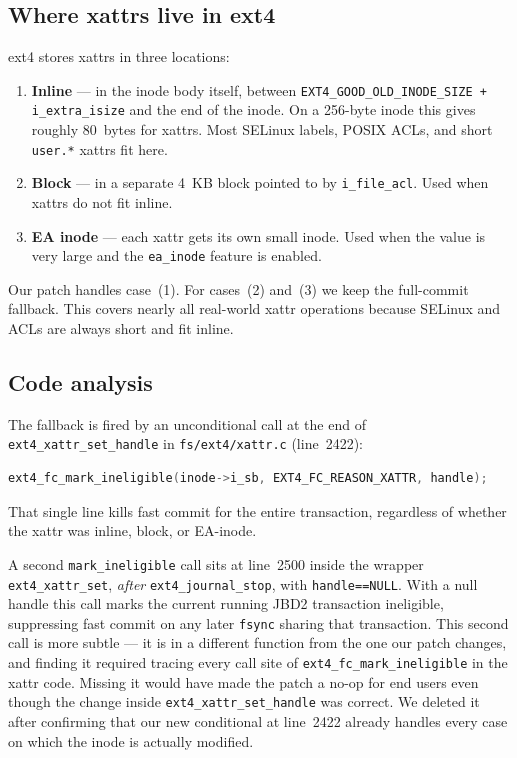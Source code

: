 \documentclass[12pt,a4paper]{article}
\begin{document}
\subsection{Where xattrs live in ext4}

ext4 stores xattrs in three locations:

\begin{enumerate}[leftmargin=*]
  \item \textbf{Inline} --- in the inode body itself, between
        \texttt{EXT4\_GOOD\_OLD\_INODE\_SIZE + i\_extra\_isize}
        and the end of the inode.  On a 256-byte inode this gives
        roughly 80~bytes for xattrs.  Most SELinux labels, POSIX
        ACLs, and short \texttt{user.*} xattrs fit here.
  \item \textbf{Block} --- in a separate 4~KB block pointed to by
        \texttt{i\_file\_acl}.  Used when xattrs do not fit inline.
  \item \textbf{EA inode} --- each xattr gets its own small inode.
        Used when the value is very large and the \texttt{ea\_inode}
        feature is enabled.
\end{enumerate}

Our patch handles case~(1).  For cases~(2) and~(3) we keep the
full-commit fallback.  This covers nearly all real-world xattr
operations because SELinux and ACLs are always short and fit inline.

\subsection{Code analysis}

The fallback is fired by an unconditional call at the end of
\texttt{ext4\_xattr\_set\_handle} in \texttt{fs/ext4/xattr.c}
(line~2422):

\begin{lstlisting}[language=C]
ext4_fc_mark_ineligible(inode->i_sb, EXT4_FC_REASON_XATTR, handle);
\end{lstlisting}

That single line kills fast commit for the entire transaction,
regardless of whether the xattr was inline, block, or EA-inode.

A second \texttt{mark\_ineligible} call sits at line~2500 inside
the wrapper \texttt{ext4\_xattr\_set}, \emph{after}
\texttt{ext4\_journal\_stop}, with \texttt{handle==NULL}.  With a
null handle this call marks the current running JBD2 transaction
ineligible, suppressing fast commit on any later \texttt{fsync}
sharing that transaction.  This second call is more subtle ---
it is in a different function from the one our patch changes, and
finding it required tracing every call site of
\texttt{ext4\_fc\_mark\_ineligible} in the xattr code.  Missing
it would have made the patch a no-op for end users even though the
change inside \texttt{ext4\_xattr\_set\_handle} was correct.
We deleted it after confirming that our new conditional at
line~2422 already handles every case on which the inode is actually
modified.
\end{document}
